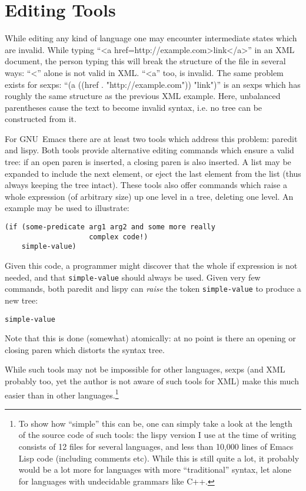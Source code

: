 \documentclass[a4paper,10pt,twoside]{report}
\newcommand{\el}{Emacs Lisp}
\newcommand{\sym}[1]{\texttt{#1}}
\newcommand{\emacs}{GNU~Emacs}
\begin{document}
\section{Editing Tools}
\label{subsec:edit-tools}

While editing any kind of language one may encounter intermediate states which
are invalid.  While typing ``<a href=http://example.com>link</a>'' in an XML
document, the person typing this will break the structure of the file in several
ways:  ``<'' alone is not valid in XML.  ``<a'' too, is invalid.  The same
problem exists for sexps: ``(a ((href . "http://example.com")) "link")'' is an
sexps which has roughly the same structure as the previous XML example.  Here,
unbalanced parentheses cause the text to become invalid syntax, i.e. no tree can
be constructed from it.

For \emacs{} there are at least two tools which address this problem:
paredit\cite{paredit} and lispy\cite{lispy}.  Both tools provide alternative
editing commands which ensure a valid tree:  if an open paren is inserted, a
closing paren is also inserted.  A list may be expanded to include the next
element, or eject the last element from the list (thus always keeping the tree
intact).  These tools also offer commands which raise a whole expression (of
arbitrary size) up one level in a tree, deleting one level.  An example may be
used to illustrate:

\begin{lstlisting}[style=lispinline]
(if (some-predicate arg1 arg2 and some more really
                    complex code!)
    simple-value)
\end{lstlisting}

Given this code, a programmer might discover that the whole if expression is not
needed, and that \sym{simple-value} should always be used.  Given very few
commands, both paredit and lispy can \emph{raise} the token \sym{simple-value}
to produce a new tree:

\begin{lstlisting}[style=lispinline]
simple-value
\end{lstlisting}

Note that this is done (somewhat) atomically: at no point is there an opening or
closing paren which distorts the syntax tree.

While such tools may not be impossible for other languages, sexps (and XML
probably too, yet the author is not aware of such tools for XML) make this much
easier than in other languages.\footnote{To show how ``simple'' this can be, one
  can simply take a look at the length of the source code of such tools: the
  lispy version I use at the time of writing consists of 12 files for several
  languages, and less than 10,000 lines of \el{} code (including comments etc).
  While this is still quite a lot, it probably would be a lot more for languages
  with more ``traditional'' syntax, let alone for languages with undecidable
  grammars like C++.}
\end{document}
